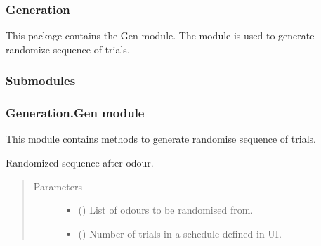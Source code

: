 \documentclass[letterpaper,10pt,english]{sphinxmanual}
\begin{document}
\subsubsection{Generation}
\label{\detokenize{NoSeMazeSchedule/Generation:generation}}
\sphinxAtStartPar
This package contains the Gen module. The module is used to generate randomize sequence of trials.


\subsubsection{Submodules}
\label{\detokenize{NoSeMazeSchedule/Generation:submodules}}

\subsubsection{Generation.Gen module}
\label{\detokenize{NoSeMazeSchedule/Generation:module-Generation.Gen}}\label{\detokenize{NoSeMazeSchedule/Generation:generation-gen-module}}
\sphinxAtStartPar
This module contains methods to generate randomise sequence of trials.

\begin{fulllineitems}
\label{\detokenize{NoSeMazeSchedule/Generation:Generation.Gen.odor_sequence}}
\pysigstartsignatures
{}
\pysigstopsignatures
\sphinxAtStartPar
Randomized sequence after odour.
\begin{quote}\begin{description}
\item[{Parameters}] \leavevmode\begin{itemize}
\item {} 
\sphinxAtStartPar
{} () \textendash{} List of odours to be randomised from.

\item {} 
\sphinxAtStartPar
{} () \textendash{} Number of trials in a schedule defined in UI.

\end{itemize}

\end{description}\end{quote}

\end{fulllineitems}
\end{document}

